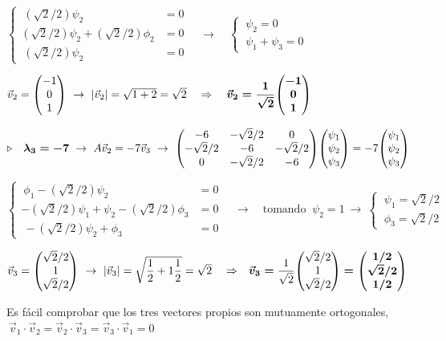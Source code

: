 $\begin{cases} \ (\sqrt{2}/2) \psi_2&=0 \\ (\sqrt{2}/2)\psi_2+(\sqrt{2}/2)\phi_2&=0   \\ \ (\sqrt{2}/2)\psi_2&=0 \end{cases} \quad\to \quad \begin{cases}\ \psi_2=0 \\ \ \psi_1+\psi_3=0 \end{cases} $

$\vec v_2= \mqty(-1\\0\\1) \ \to \ |\vec v_2|=\sqrt{1+2}=\sqrt{2}  \quad \Rightarrow \quad \boldsymbol{\vec v_2 = \dfrac 1{\sqrt{2}} \mqty(-1\\0\\1)}$



$\triangleright \quad 	\boldsymbol{ \lambda_3=-7 } \ \to \ A \vec v_2 = -7 \vec v_3 \ \to \ \mqty(-6 &-\sqrt{2}/2 &0 \\ -\sqrt{2}/2&-6&-\sqrt{2}/2 \\ 0 & -\sqrt{2}/2&-6 ) \mqty( \psi_1 \\ \psi_2 \\ \psi_3) = -7 \mqty( \psi_1 \\ \psi_2 \\ \psi_3) $

	
$\begin{cases} \ \phi_1-(\sqrt{2}/2) \psi_2&=0 \\ -(\sqrt{2}/2)\psi_1+\psi_2-(\sqrt{2}/2)\phi_3&=0   \\ \ -(\sqrt{2}/2)\psi_2+\phi_3&=0 \end{cases} \quad\to \quad  \text{tomando } \ \psi_2=1 \ \to \ \begin{cases} \ \psi_1=\sqrt{2}/2 \\ \ \phi_3=\sqrt{2}/2\end{cases}$


$\vec v_3=\mqty( \sqrt{2}/2 \\ 1 \\ \sqrt{2}/2) \ \to \ |\vec v_3|=\sqrt{\dfrac 1 2 + 1 \dfrac 1 2 }=\sqrt{2} \quad \Rightarrow \quad \boldsymbol{\vec v_3=} \dfrac 1{\sqrt{2}}\mqty( \sqrt{2}/2 \\ 1 \\ \sqrt{2}/2) \boldsymbol{=\mqty(1/2\\ \sqrt{2}/2 \\1/2)}$

Es fácil comprobar que los tres vectores propios son mutuamente ortogonales, $\ \vec v_1 \cdot \vec v_2=\vec v_2 \cdot \vec v_3=\vec v_3 \cdot \vec v_1=0$

